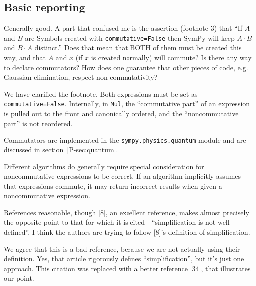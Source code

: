 \documentclass[answers,12pt]{exam}
\begin{document}
\subsection{Basic reporting}
\begin{questions}
\question Generally good. A part that confused me is the assertion (footnote 3) that ``If
$A$ and $B$ are Symbols created with \texttt{commutative=False} then SymPy will keep
$A\cdot B$
and $B\cdot A$ distinct.'' Does that mean that BOTH of them must be created this way,
and that $A$ and $x$ (if $x$ is created normally) will commute? Is there any way to
declare commutators? How does one guarantee that other pieces of code, e.g.
Gaussian elimination, respect non-commutativity?
\begin{solution}
  We have clarified the footnote. Both expressions must be set as
  \texttt{commutative=False}. Internally, in \texttt{Mul}, the ``commutative
  part'' of an expression is pulled out to the front and canonically ordered,
  and the ``noncommutative part'' is not reordered.

Commutators are implemented in the \texttt{sympy.physics.quantum} module and
are discussed in section~\ref{P-sec:quantum}.

Different algorithms do generally require special consideration for
noncommutative expressions to be correct. If an algorithm implicitly assumes
that expressions commute, it may return incorrect results when given a
noncommutative expression.
\end{solution}

\question References reasonable, though [8], an excellent reference, makes almost
precisely the opposite point to that for which it is cited---``simplification
is not well-defined''. I think the authors are trying to follow [8]'s
definition of simplification.
\begin{solution}
We agree that this is a bad reference, because we are not actually
using their definition.  Yes, that article rigorously defines
``simplification'', but it's just one approach.  This citation
was replaced with a better reference [34], that illustrates our point.
\end{solution}
\end{questions}
\end{document}

